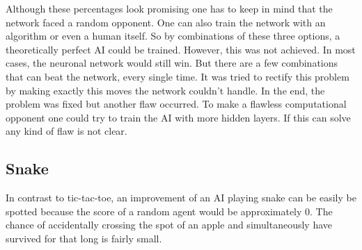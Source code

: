\documentclass[12pt]{article}
\begin{document}
Although these percentages look promising one has to keep in mind that the network faced a random opponent. One can also train the network with an algorithm or even a human itself. So by combinations of these three options, a theoretically perfect \gls{AI} could be trained. However, this was not achieved. In most cases, the \gls{neuronal network} would still win. But there are a few combinations that can beat the network, every single time. It was tried to rectify this problem by making exactly this moves the network couldn't handle. In the end, the problem was fixed but another flaw occurred. To make a flawless computational opponent one could try to train the AI with more hidden layers. If this can solve any kind of flaw is not clear.
\subsection{Snake}\label{sec:snake} 
In contrast to tic-tac-toe, an improvement of an \gls{AI} playing snake can be easily be spotted because the score of a random agent would be approximately $0$. The chance of accidentally crossing the spot of an apple and simultaneously have survived for that long is fairly small.   
\clearpage
\end{document}
